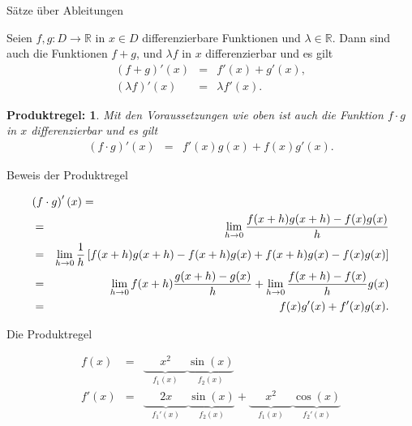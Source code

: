 \documentclass[german]{beamer}
\newcommand{\bq}{\begin{eqnarray*}}
\newcommand{\eq}{\end{eqnarray*}}
\newtheorem*{mytheorem23}{Produktregel:}
\begin{document}
\begin{frame}{S\"atze \"uber Ableitungen}

\begin{theorem}
Seien $f,g : D \rightarrow \mathbb R$ in $x \in D$ differenzierbare Funktionen und 
$\lambda \in \mathbb R$.
Dann sind auch die Funktionen $f+g$, und $\lambda f$ in $x$ differenzierbar
und es gilt
\bq
 \left(f+g\right)'(x) & = & f'(x) + g'(x),
 \nonumber \\
 \left( \lambda f \right)'(x) & = & \lambda f'(x).
\eq
\end{theorem}

\begin{mytheorem23}
Mit den Voraussetzungen wie oben ist auch die Funktion $f\cdot g$ in $x$ differenzierbar
und es gilt
\bq
 \left( f \cdot g \right)'(x) & = & f'(x) g(x) + f(x) g'(x).
\eq
\end{mytheorem23}

\end{frame}

\begin{frame}{Beweis der Produktregel}

{\small
\bq
\lefteqn{
\left( f \cdot g \right)'(x) = 
} & &
 \nonumber \\
 & = &
 \lim\limits_{h\rightarrow 0} \frac{f(x+h)g(x+h)-f(x)g(x)}{h}
 \nonumber \\
 & = &
 \lim\limits_{h\rightarrow 0} \frac{1}{h} \left[ f(x+h)g(x+h)-f(x+h)g(x)+f(x+h)g(x)-f(x)g(x) \right]
 \nonumber \\
 & = &
 \lim\limits_{h\rightarrow 0} f(x+h) \frac{g(x+h)-g(x)}{h} 
 + \lim\limits_{h\rightarrow 0}\frac{f(x+h)-f(x)}{h}g(x)
 \nonumber \\
 & = &
 f(x) g'(x) + f'(x) g(x).
\eq
}

\end{frame}

\begin{frame}{Die Produktregel}

\begin{example}
\bq
 f\left(x\right) & = & \underbrace{\phantom{\left(x\right.}x^2\phantom{\left.x\right)} }_{f_1\left(x\right)} \underbrace{\sin\left(x\right)}_{f_2\left(x\right)}
 \nonumber \\
 f'\left(x\right) & = & 
 \underbrace{\phantom{\left(x\right.}2 x\phantom{\left.x\right)} }_{f_1'\left(x\right)} \underbrace{\sin\left(x\right)}_{f_2\left(x\right)} 
 + \underbrace{\phantom{\left(x\right.}x^2\phantom{\left.x\right)} }_{f_1\left(x\right)} \underbrace{\cos\left(x\right)}_{f_2'\left(x\right)}
\eq
\end{example}

\end{frame}
\end{document}
